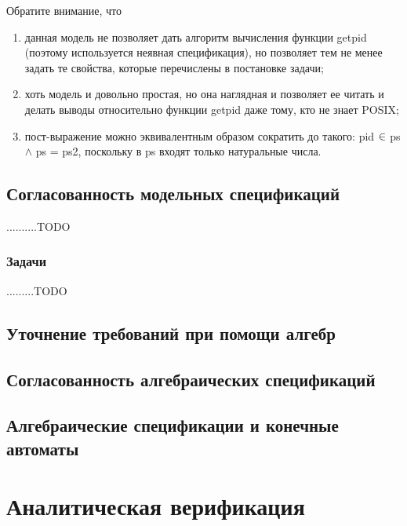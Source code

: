 \documentclass[14pt, twoside]{extreport}
\newcounter{problem_type}[chapter]
\newcounter{zadacha}[problem_type]
\newcommand{\z}{\vspace{0.5cm}\par\addtocounter{zadacha}{1}%
\textit{\arabic{chapter}.\arabic{problem_type}.\arabic{zadacha}}~~  }
\newcommand{\head}[1]{\vspace{1cm}\subsubsection*{#1}}
\newcommand{\zhead}[1]{\head{#1} \refstepcounter{problem_type}}
\begin{document}
Обратите внимание, что
\begin{enumerate}
  \item данная модель не позволяет дать алгоритм вычисления функции getpid (поэтому используется неявная спецификация), но позволяет тем не менее задать те свойства, которые перечислены в постановке задачи;
  \item хоть модель и довольно простая, но она наглядная и позволяет ее читать и делать выводы относительно функции getpid даже тому, кто не знает POSIX;
  \item пост-выражение можно эквивалентным образом сократить до такого: pid $\in$ ps $\wedge$ ps = ps2, поскольку в ps входят только натуральные числа.
\end{enumerate}


\section{Согласованность модельных спецификаций}

..........TODO


\subsection*{Задачи}
.........TODO



\section{Уточнение требований при помощи алгебр}

\section{Согласованность алгебраических спецификаций}

\section{Алгебраические спецификации и конечные автоматы}

\chapter{Аналитическая верификация}
\end{document}
